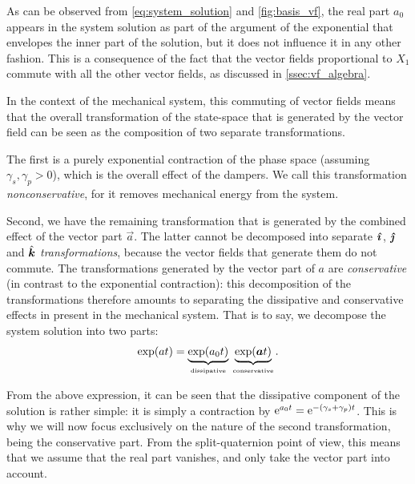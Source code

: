 As can be observed from \cref{eq:system_solution} and \cref{fig:basis_vf}, the real part \(a_0\) appears in the system solution as part of the argument of the exponential that envelopes the inner part of the solution, but it does not influence it in any other fashion. This is a consequence of the fact that the vector fields proportional to \(X_1\) commute with all the other vector fields, as discussed in \cref{ssec:vf_algebra}. 

In the context of the mechanical system, this commuting of vector fields means that the overall transformation of the state-space that is generated by the vector field can be seen as the composition of two separate transformations. 

The first is a purely exponential contraction of the phase space (assuming \(\gamma_s, \gamma_p > 0\)), which is the overall effect of the dampers. We call this transformation \emph{nonconservative}, for it removes mechanical energy from the system. 

Second, we have the remaining transformation that is generated by the combined effect of the vector part \(\vec{a}\). The latter cannot be decomposed into separate \(\quati\), \(\quatj\) and \(\quatk\) \emph{transformations}, because the vector fields that generate them do not commute. The transformations generated by the vector part of \(a\) are \emph{conservative} (in contrast to the exponential contraction): this decomposition of the transformations therefore amounts to separating the dissipative and conservative effects in present in the mechanical system. That is to say, we decompose the system solution into two parts:
\begin{equation}
     \exp(a t) = \underbrace{\exp(a_0 t)}_{\text{\tiny dissipative}} \: \underbrace{\exp(\vec{a} t)}_{\text{\tiny conservative}}.
\end{equation}

From the above expression, it can be seen that the dissipative component of the solution is rather simple: it is simply a contraction by \(\ec^{a_0t } = \ec^{-(\gamma_s + \gamma_p)t}\). This is why we will now focus exclusively on the nature of the second transformation, being the conservative part. From the split-quaternion point of view, this means that we assume that the real part vanishes, and only take the vector part into account.

